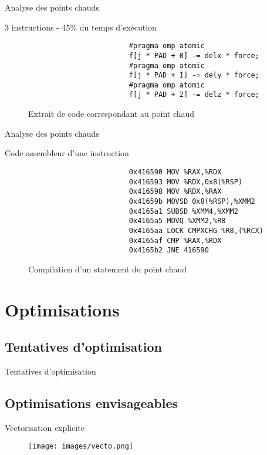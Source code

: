 \documentclass[9.5pt]{beamer}
\begin{document}
		\begin{frame}[fragile]{Analyse des points chauds}
			\begin{block}{3 instructions - 45\% du temps d'exécution}
				\begin{figure}[h!]
					\begin{verbatim}
						#pragma omp atomic
						f[j * PAD + 0] -= delx * force;
						#pragma omp atomic
						f[j * PAD + 1] -= dely * force;
						#pragma omp atomic
						f[j * PAD + 2] -= delz * force;
					\end{verbatim}
					\centering
					\caption{Extrait de code correspondant au point chaud}
					\label{code:hotspot}
				\end{figure}
			\end{block}
\end{frame}

		\begin{frame}[fragile]{Analyse des points chauds}
			\begin{block}{Code assembleur d'une instruction}
				\begin{figure}[h!]
					\begin{verbatim}
						0x416590 MOV %RAX,%RDX
						0x416593 MOV %RDX,0x8(%RSP)
						0x416598 MOV %RDX,%RAX
						0x41659b MOVSD 0x8(%RSP),%XMM2
						0x4165a1 SUBSD %XMM4,%XMM2
						0x4165a5 MOVQ %XMM2,%R8
						0x4165aa LOCK CMPXCHG %R8,(%RCX)
						0x4165af CMP %RAX,%RDX
						0x4165b2 JNE 416590
					\end{verbatim}
					\centering
					\caption{Compilation d'un statement du point chaud}
					\label{code:hotspot}
				\end{figure}
			\end{block}
\end{frame}

\section{Optimisations}
	\subsection{Tentatives d'optimisation}
		\begin{frame}{Tentatives d'optimisation}
		\end{frame}

	\subsection{Optimisations envisageables}
		\begin{frame}{Vectorisation explicite}
			\begin{figure}
				\texttt{[image: images/vecto.png]}
			\end{figure}
		\end{frame}
\end{document}
